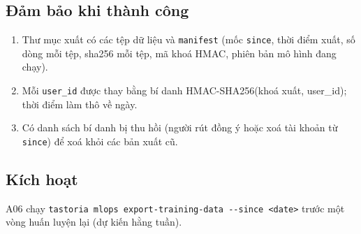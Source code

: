 \subsection{Đảm bảo khi thành công}
\begin{enumerate}
\item Thư mục xuất có các tệp dữ liệu và {\small\texttt{manifest}} (mốc {\small\texttt{since}}, thời điểm xuất, số dòng mỗi tệp, sha256 mỗi tệp, mã khoá HMAC, phiên bản mô hình đang chạy).
\item Mỗi {\small\texttt{user\_\allowbreak{}\allowbreak{}id}} được thay bằng bí danh HMAC-\allowbreak{}SHA256(khoá xuất, user\_\allowbreak{}id); thời điểm làm thô về ngày.
\item Có danh sách bí danh bị thu hồi (người rút đồng ý hoặc xoá tài khoản từ {\small\texttt{since}}) để xoá khỏi các bản xuất cũ.
\end{enumerate}
\subsection{Kích hoạt}
A06 chạy {\small\texttt{tastoria mlops export-\allowbreak{}training-\allowbreak{}data -\allowbreak{}-\allowbreak{}since <date>}} trước một vòng huấn luyện lại (dự kiến hằng tuần).

